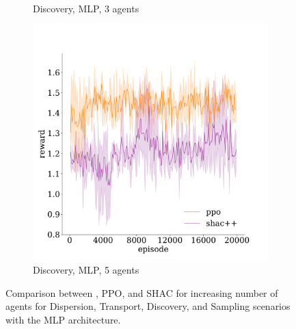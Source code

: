 \begin{figure}[t]
\begin{subfigure}[b]{0.32\textwidth}
        \caption{Discovery, MLP, 3 agents}
        \label{apx:fig:discovery-mlp-3}
    \end{subfigure}
    \begin{subfigure}[b]{0.32\textwidth}
        \includegraphics[width=\textwidth]{figs/discovery-5-mlp.pdf}
        \caption{Discovery, MLP, 5 agents}
        \label{apx:fig:discovery-mlp-5}
    \end{subfigure}

    \caption{Comparison between \fname{}, PPO, and SHAC for increasing number of agents for Dispersion, Transport, Discovery, and Sampling scenarios with the MLP architecture.}
    \label{apx:fig:experiments-mlp}

\end{figure}

